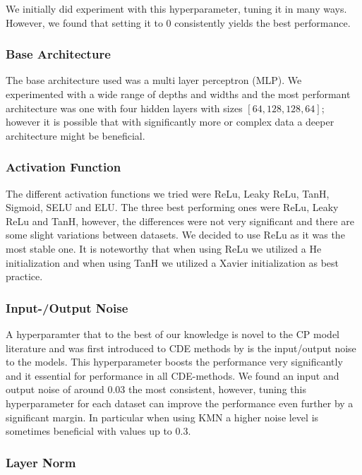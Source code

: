 We initially did experiment with this hyperparameter, tuning it in many ways. However, we found that setting it to $0$ consistently yields the best performance.

\subsubsection{Base Architecture}

The base architecture used was a multi layer perceptron (MLP). We experimented with a wide range of depths and widths and the most performant architecture was one with four hidden layers with sizes $[64, 128, 128, 64]$; however it is possible that with significantly more or complex data a deeper architecture might be beneficial.

\subsubsection{Activation Function}

The different activation functions we tried were ReLu, Leaky ReLu, TanH, Sigmoid, SELU and ELU. The three best performing ones were ReLu, Leaky ReLu and TanH, however, the differences were not very significant and there are some slight variations between datasets. We decided to use ReLu as it was the most stable one. It is noteworthy that when using ReLu we utilized a He initialization and when using TanH we utilized a Xavier initialization as best practice.

\subsubsection{Input-/Output Noise}

A hyperparamter that to the best of our knowledge is novel to the CP model literature and was first introduced to CDE methods by \cite{rothfuss2019noise} is the input/output noise to the models. This hyperparameter boosts the performance very significantly and it essential for performance in all CDE-methods. We found an input and output noise of around $0.03$ the most consistent, however, tuning this hyperparameter for each dataset can improve the performance even further by a significant margin. In particular when using KMN a higher noise level is sometimes beneficial with values up to $0.3$.

\subsubsection{Layer Norm}


